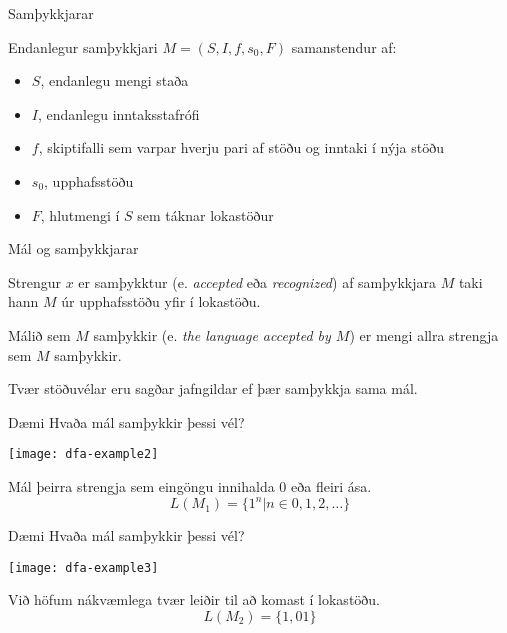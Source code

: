 \documentclass{beamer}
\begin{document}
\begin{frame}{Samþykkjarar}
\begin{tcolorbox}[title=Samþykkjarar]
Endanlegur samþykkjari $M = (S, I , f, s_0, F)$ samanstendur af:
\begin{itemize}
 \item $S$, endanlegu mengi staða
 \item $I$, endanlegu inntaksstafrófi
 \item $f$, skiptifalli sem varpar hverju pari af stöðu og inntaki í nýja stöðu
 \item $s_0$, upphafsstöðu
 \item $F$, hlutmengi í $S$ sem táknar lokastöður
\end{itemize}
\end{tcolorbox}
\end{frame}

\begin{frame}{Mál og samþykkjarar}
\begin{tcolorbox}
Strengur $x$ er samþykktur (e. \emph{accepted} eða \emph{recognized}) af samþykkjara $M$ taki hann $M$ úr upphafsstöðu yfir í lokastöðu.

Málið sem $M$ samþykkir (e. \emph{the language accepted by $M$}) er mengi allra strengja sem $M$ samþykkir.
\end{tcolorbox}
Tvær stöðuvélar eru sagðar jafngildar ef þær samþykkja sama mál.
\end{frame}

\begin{frame}{Dæmi}
Hvaða mál samþykkir þessi vél?

\begin{center}
\texttt{[image: dfa-example2]}
\end{center}

\pause
Mál þeirra strengja sem eingöngu innihalda 0 eða fleiri ása.
\[
 L(M_1) = \{1^n | n \in 0, 1, 2, \ldots \}
\]

\end{frame}

\begin{frame}{Dæmi}
Hvaða mál samþykkir þessi vél?

\begin{center}
\texttt{[image: dfa-example3]}
\end{center}

\pause
Við höfum nákvæmlega tvær leiðir til að komast í lokastöðu.
\[
 L(M_2) = \{1,01\}
\]

\end{frame}
\end{document}

